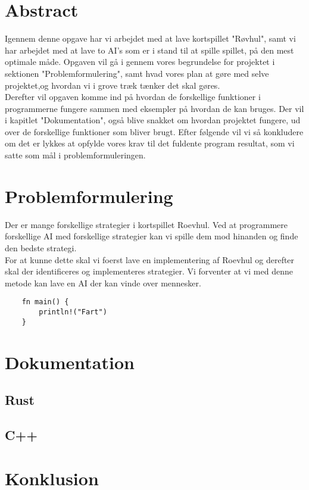 \documentclass[12pt]{article}
\begin{document}
\section{Abstract}

Igennem denne opgave har vi arbejdet med at lave kortspillet "Røvhul", samt vi har arbejdet med at lave to AI's som er i stand til at spille spillet, på den mest optimale måde. Opgaven vil gå i gennem vores begrundelse for projektet i sektionen "Problemformulering", samt hvad vores plan at gøre med selve projektet,og hvordan vi i grove træk tænker det skal gøres.
\\
Derefter vil opgaven komme ind på hvordan de forskellige funktioner i programmerne fungere sammen med eksempler på hvordan de kan bruges. Der vil i kapitlet "Dokumentation", også blive snakket om hvordan projektet fungere, ud over de forskellige funktioner som bliver brugt. Efter følgende vil vi så konkludere om det er lykkes at opfylde vores krav til det fuldente program resultat, som vi satte som mål i problemformuleringen.

\section{Problemformulering} \label{sec:Problemformulering}

Der er mange forskellige strategier i kortspillet Roevhul. Ved at programmere forskellige AI med forskellige strategier kan vi spille dem mod hinanden og finde den bedste strategi.
\\
For at kunne dette skal vi foerst lave en implementering af Roevhul og derefter skal der identificeres og implementeres strategier. Vi forventer at vi med denne metode kan lave en AI der kan vinde over mennesker.

\begin{verbatim}
	fn main() {
		println!("Fart")
	}
\end{verbatim}

\vfill
\pagebreak

\section{Dokumentation}
\subsection{Rust}

\subsection{C++}


\vfill
\pagebreak

\section{Konklusion}

\vfill
\pagebreak
\end{document}
